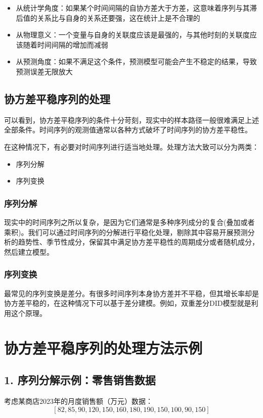 \begin{itemize}
    \item 从统计学角度：如果某个时间间隔的自协方差大于方差，这意味着序列与其滞后值的关系比与自身的关系还要强，这在统计上是不合理的
    \item 从物理意义：一个变量与自身的关联度应该是最强的，与其他时刻的关联度应该随着时间间隔的增加而减弱
    \item 从预测角度：如果不满足这个条件，预测模型可能会产生不稳定的结果，导致预测误差无限放大
\end{itemize}



\subsection{协方差平稳序列的处理}

可以看到，协方差平稳序列的条件十分苛刻，现实中的样本路径一般很难满足上述全部条件。时间序列的观测值通常以各种方式破坏了时间序列的协方差平稳性。

在这种情况下，有必要对时间序列进行适当地处理。处理方法大致可以分为两类：
\begin{itemize}
    \item 序列分解
    \item 序列变换
\end{itemize}

\subsubsection{序列分解}
现实中的时间序列之所以复杂，是因为它们通常是多种序列成分的复合(叠加或者乘积)。我们可以通过时间序列的分解进行平稳化处理，剔除其中容易开展预测分析的趋势性、季节性成分，保留其中满足协方差平稳性的周期成分或者随机成分，然后建立模型。

\subsubsection{序列变换}
最常见的序列变换是差分。有很多时间序列本身协方差并不平稳，但其增长率却是协方差平稳的，在这种情况下可以基于差分建模。例如，双重差分DID模型就是利用这个原理。



\section{协方差平稳序列的处理方法示例}

\subsection{1. 序列分解示例：零售销售数据}
考虑某商店2023年的月度销售额（万元）数据：
$$[82, 85, 90, 120, 150, 160, 180, 190, 150, 100, 90, 150]$$

